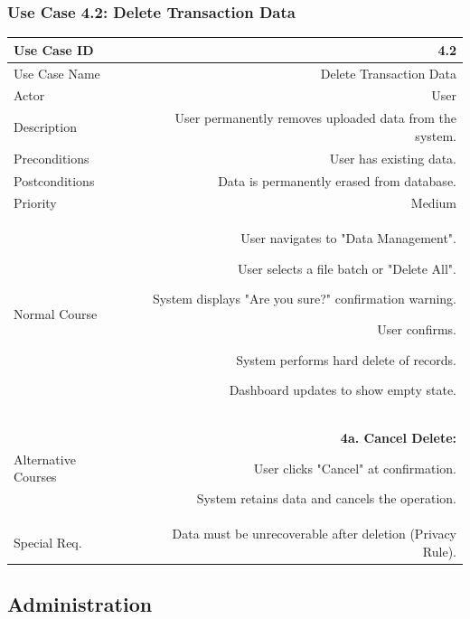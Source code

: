 \subsubsection{Use Case 4.2: Delete Transaction Data}
\begin{tabularx}{\textwidth}{|L|R|}
	\hline
	Use Case ID & 4.2 \\ \hline
	Use Case Name & Delete Transaction Data \\ \hline
	Actor & User \\ \hline
	Description & User permanently removes uploaded data from the system. \\ \hline
	Preconditions & User has existing data. \\ \hline
	Postconditions & Data is permanently erased from database. \\ \hline
	Priority & Medium \\ \hline
	Normal Course & 
	\begin{normalsteps}
		\item User navigates to "Data Management".
		\item User selects a file batch or "Delete All".
		\item System displays "Are you sure?" confirmation warning.
		\item User confirms.
		\item System performs hard delete of records.
		\item Dashboard updates to show empty state.
	\end{normalsteps} \\ \hline
	Alternative Courses & 
	\textbf{4a. Cancel Delete:} 
	\begin{altsteps}
		\item User clicks "Cancel" at confirmation.
		\item System retains data and cancels the operation.
	\end{altsteps} \\ \hline
	Special Req. & Data must be unrecoverable after deletion (Privacy Rule). \\ \hline
\end{tabularx}

\newpage

\subsection{Administration}

